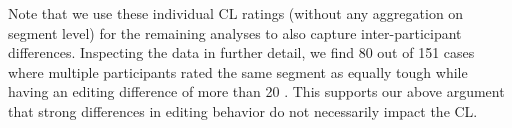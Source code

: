 \documentclass[output=paper]{langsci/langscibook}
\begin{document}
Note that we use these individual CL ratings (without any aggregation on segment level) for the remaining analyses to also capture inter-participant differences.
Inspecting the data in further detail, we find %
80 out of 151 cases where multiple participants rated the same segment as equally tough while having an editing difference of more than 20 \hter{}. This supports our above argument that strong differences in editing behavior do not necessarily impact the CL.



%
\end{document}
